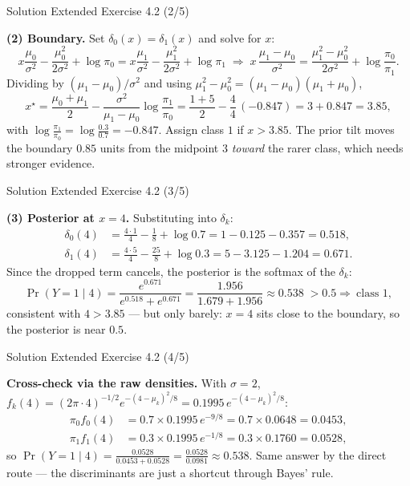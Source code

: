 \documentclass[aspectratio=169,11pt]{beamer}
\begin{document}
\begin{frame}{Solution \textemdash{} Extended Exercise 4.2 (2/5)}
\begin{solutionbox}
\scriptsize
\textbf{(2) Boundary.} Set $\delta_0(x)=\delta_1(x)$ and solve for $x$:
\[
  x\frac{\mu_0}{\sigma^2}-\frac{\mu_0^2}{2\sigma^2}+\log\pi_0
  = x\frac{\mu_1}{\sigma^2}-\frac{\mu_1^2}{2\sigma^2}+\log\pi_1
  \;\Longrightarrow\;
  x\,\frac{\mu_1-\mu_0}{\sigma^2}
  = \frac{\mu_1^2-\mu_0^2}{2\sigma^2}+\log\frac{\pi_0}{\pi_1}.
\]
Dividing by $(\mu_1-\mu_0)/\sigma^2$ and using
$\mu_1^2-\mu_0^2=(\mu_1-\mu_0)(\mu_1+\mu_0)$,
\[
  x^\star=\frac{\mu_0+\mu_1}{2}
          -\frac{\sigma^2}{\mu_1-\mu_0}\log\frac{\pi_1}{\pi_0}
        =\frac{1+5}{2}-\frac{4}{4}\,(-0.847)
        =3+0.847=3.85 ,
\]
with $\log\frac{\pi_1}{\pi_0}=\log\frac{0.3}{0.7}=-0.847$. Assign class
$1$ if $x>3.85$. The prior tilt moves the boundary $0.85$ units from the
midpoint $3$ \emph{toward} the rarer class, which needs stronger
evidence.
\end{solutionbox}
\end{frame}

\begin{frame}{Solution \textemdash{} Extended Exercise 4.2 (3/5)}
\begin{solutionbox}
\textbf{(3) Posterior at $x=4$.} Substituting into $\delta_k$:
\[
\begin{aligned}
  \delta_0(4)&=\tfrac{4\cdot1}{4}-\tfrac{1}{8}+\log 0.7
              =1-0.125-0.357=0.518,\\
  \delta_1(4)&=\tfrac{4\cdot5}{4}-\tfrac{25}{8}+\log 0.3
              =5-3.125-1.204=0.671.
\end{aligned}
\]
Since the dropped term cancels, the posterior is the softmax of the
$\delta_k$:
\[
  \Pr(Y=1\mid 4)=\frac{e^{0.671}}{e^{0.518}+e^{0.671}}
  =\frac{1.956}{1.679+1.956}\approx 0.538
  \;>0.5\Rightarrow\ \text{class } 1 ,
\]
consistent with $4>3.85$ --- but only barely: $x=4$ sits close to the
boundary, so the posterior is near $0.5$.
\end{solutionbox}
\end{frame}

\begin{frame}{Solution \textemdash{} Extended Exercise 4.2 (4/5)}
\begin{solutionbox}
\textbf{Cross-check via the raw densities.} With $\sigma=2$,
$f_k(4)=(2\pi\cdot 4)^{-1/2}e^{-(4-\mu_k)^2/8}=0.1995\,e^{-(4-\mu_k)^2/8}$:
\[
\begin{aligned}
  \pi_0 f_0(4)&=0.7\times 0.1995\,e^{-9/8}=0.7\times 0.0648=0.0453,\\
  \pi_1 f_1(4)&=0.3\times 0.1995\,e^{-1/8}=0.3\times 0.1760=0.0528,
\end{aligned}
\]
so $\Pr(Y=1\mid 4)=\frac{0.0528}{0.0453+0.0528}
=\frac{0.0528}{0.0981}\approx 0.538$. \checkmark\;
Same answer by the direct route --- the discriminants are just a
shortcut through Bayes' rule.

\vspace{1mm}
\end{solutionbox}
\end{frame}
\end{document}
